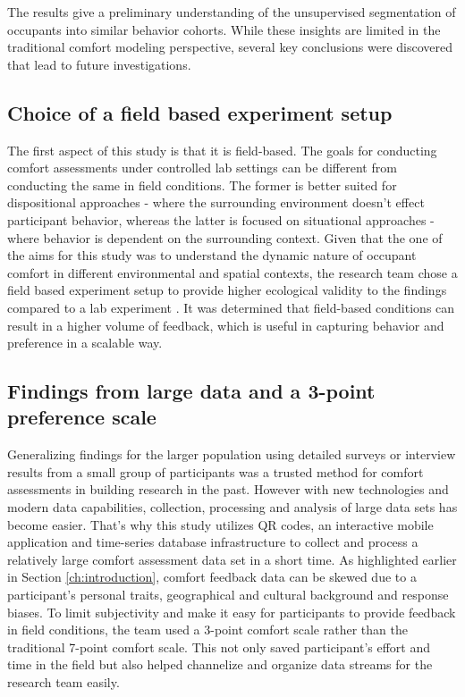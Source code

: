 The results give a preliminary understanding of the unsupervised segmentation of occupants into similar behavior cohorts. While these insights are limited in the traditional comfort modeling perspective, several key conclusions were discovered that lead to future investigations.

\subsection{Choice of a field based experiment setup}
The first aspect of this study is that it is field-based. The goals for conducting comfort assessments under controlled lab settings can be different from conducting the same in field conditions. The former is better suited for dispositional approaches - where the surrounding environment doesn't effect participant behavior, whereas the latter is focused on situational approaches - where behavior is dependent on the surrounding context. Given that the one of the aims for this study was to understand the dynamic nature of occupant comfort in different environmental and spatial contexts, the research team chose a field based experiment setup to provide higher ecological validity to the findings compared to a lab experiment \cite{andrade2018internal}. It was determined that field-based conditions can result in a higher volume of feedback, which is useful in capturing behavior and preference in a scalable way.         


\subsection{Findings from large data and a 3-point preference scale}

Generalizing findings for the larger population using detailed surveys or interview results from a small group of participants was a trusted method for comfort assessments in building research in the past. However with new technologies and modern data capabilities, collection, processing and analysis of large data sets has become easier. That's why this study utilizes QR codes, an interactive mobile application and time-series database infrastructure to collect and process a relatively large comfort assessment data set in a short time. As highlighted earlier in Section \ref{ch:introduction}, comfort feedback data can be skewed due to a participant's personal traits, geographical and cultural background and response biases. To limit subjectivity and make it easy for participants to provide feedback in field conditions, the team used a 3-point comfort scale rather than the traditional 7-point comfort scale. This not only saved participant's effort and time in the field but also helped channelize and organize data streams for the research team easily.


